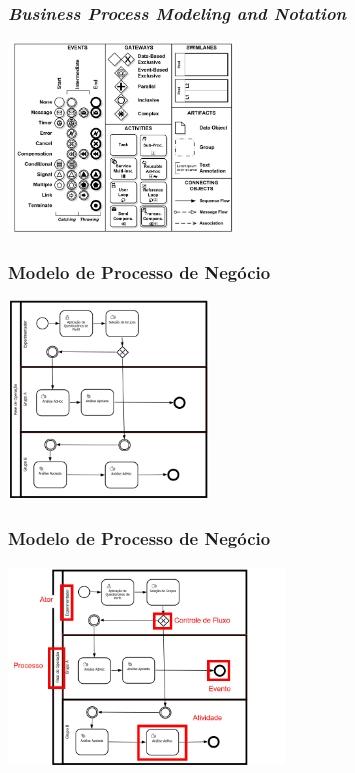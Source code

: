 \documentclass[aspectratio=169]{beamer}
\begin{document}
\begin{frame}
\frametitle{\textit{Business Process Modeling and Notation}}
\justifying

\begin{center}
\includegraphics[width=0.45\textwidth]{elementos.png}
\end{center}


\end{frame}

\begin{frame}
\frametitle{Modelo de Processo de Negócio}
\justifying

\begin{center}
\includegraphics[width=0.4\textwidth]{protocolo.png}
\end{center}


\end{frame}

\begin{frame}
\frametitle{Modelo de Processo de Negócio}
\justifying

\begin{center}
\includegraphics[width=0.55\textwidth]{explicado.png}
\end{center}


\end{frame}
\end{document}
